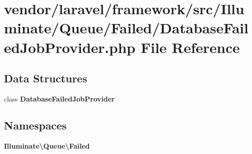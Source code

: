 \section{vendor/laravel/framework/src/\+Illuminate/\+Queue/\+Failed/\+Database\+Failed\+Job\+Provider.php File Reference}
\label{_database_failed_job_provider_8php}
\subsection*{Data Structures}
\begin{DoxyCompactItemize}
\item 
class {\bf Database\+Failed\+Job\+Provider}
\end{DoxyCompactItemize}
\subsection*{Namespaces}
\begin{DoxyCompactItemize}
\item 
 {\bf Illuminate\textbackslash{}\+Queue\textbackslash{}\+Failed}
\end{DoxyCompactItemize}
